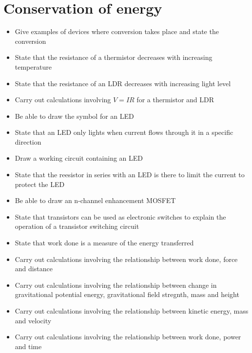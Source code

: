 \section{Conservation of energy}
\begin{multicols}{2}
	\begin{itemize}
		\item Give examples of devices where conversion takes place and state the
			conversion
		\item State that the resistance of a thermistor decreases with increasing temperature
		\item State that the resistance of an LDR decreases with increasing light 
			level
		\item Carry out calculations involving $V=IR$ for a thermistor and LDR
		\item Be able to draw the symbol for an LED
		\item State that an LED only lights when current flows through it in a
			specific direction
		\item Draw a working circuit containing an LED
		\item State that the reesistor in series with an LED is there to limit the
			current to protect the LED
		\item Be able to draw an n-channel enhancement MOSFET
		\item State that transistors can be used as electronic switches to explain
			the operation of a transistor switching circuit
		\item State that work done is a measure of the energy transferred
		\item Carry out calculations involving the relationship between work done,
			force and distance
		\item Carry out calculations involving the relationship between change in
			gravitational potential energy, gravitational field stregnth, mass and
			height
		\item Carry out calculations involving the relationship between kinetic energy, mass and velocity
		\item Carry out calculations involving the relationship between work done,
			power and time
	\end{itemize}
\end{multicols}

